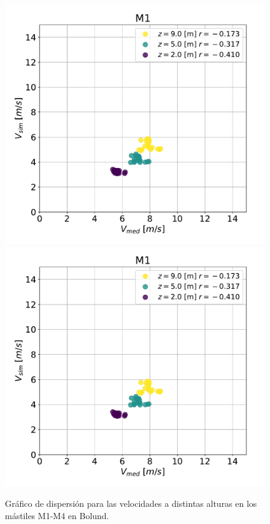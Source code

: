 \begin{figure}[H]
	\includegraphics[width=0.5\linewidth,page=3,trim={0cm 0cm 0cm 0cm},clip]{Imagenes/06/bol/corr}%
	\includegraphics[width=0.5\linewidth,page=4,trim={0cm 0cm 0cm 0cm},clip]{Imagenes/06/bol/corr}%
	\caption{Gráfico de dispersión para las velocidades a distintas alturas en los mástiles M1-M4 en Bolund.}
	\label{fig:06_corr_bol1}
\end{figure}
\vspace*{\fill}
\newpage
\vspace*{\fill}
